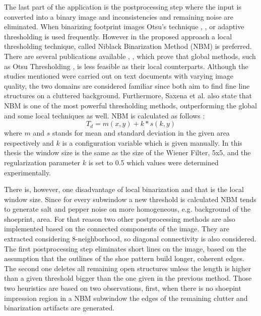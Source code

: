 \documentclass[draft,final]{vutinfth} %
\begin{document}
\par
The last part of the application is the postprocessing step where the input is converted into a binary image and inconsistencies and remaining noise are eliminated.
When binarizing footprint images Otsu's technique \cite{algarni2008novel}, \cite{alizadeh2017automatic}, \cite{wu2019crime} or adaptive thresholding \cite{wang2014automatic} is used frequently.
However in the proposed approach a local thresholding technique, called Niblack Binarization Method (NBM) \cite{niblack1985introduction} is preferred.
There are several publications available \cite{som2011application}, \cite{athimethphat2011review}, which prove that global methods, such as Otsu Thresholding \cite{otsu1979threshold}, is less feasible as their local counterparts.
Although the studies mentioned were carried out on text documents with varying image quality, the two domains are considered familiar since both aim to find fine line structures on a cluttered background.
Furthermore, Saxena et al. \cite{saxena2019niblack} also state that NBM is one of the most powerful thresholding methods, outperforming the global and some local techniques as well. 
NBM  is calculated as follows \cite{saxena2019niblack}:
\[T_d = m(x,y) + k * s(k, y)\]
where $m$ and $s$ stands for mean and standard deviation in the given area respectively and $k$ is a configuration variable which is given manually. 
In this thesis the window size is the same as the size of the Wiener Filter, 5x5, and the regularization parameter $k$ is set to 0.5 which values were determined experimentally.
\par
There is, however, one disadvantage of local binarization and that is the  local window size.
Since for every subwindow a new threshold is calculated NBM tends to generate salt and pepper noise on more homogeneous, e.g. background of the shoeprint, area.
For that reason two other postprocessing methods are also implemented based on the connected components of the image.
They are extracted considering 8-neighborhood, so diagonal connectivity is also considered.
The first postprocessing step eliminates short lines on the image, based on the assumption that the outlines of the shoe pattern build longer, coherent edges.
The second one deletes all remaining open structures unless the length is higher than a given threshold bigger than the one given in the previous method.
Those two heuristics are based on two observations, first,  when there is no shoepint impression region in a NBM subwindow the edges of the remaining clutter and binarization artifacts are generated.
\end{document}
